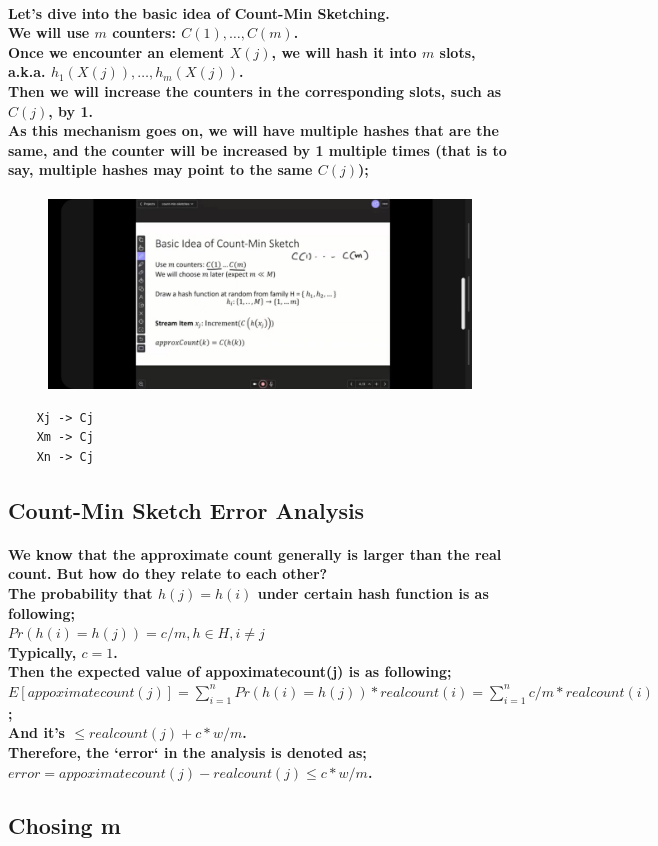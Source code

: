 \documentclass{article}
\begin{document}
\paragraph{
    Let's dive into the basic idea of Count-Min Sketching.\\
    We will use $m$ counters: $C(1), \ldots, C(m)$.\\
    Once we encounter an element $X(j)$, we will hash it into $m$ slots, a.k.a. $h_1(X(j)), \ldots, h_m(X(j))$.\\
    Then we will increase the counters in the corresponding slots, such as $C(j)$, by 1.\\
    As this mechanism goes on, we will have multiple hashes that are the same, and the counter will be increased by 1 multiple times
    (that is to say, multiple hashes may point to the same $C(j)$);\\
}

\begin{figure}[H]
    \includegraphics[width=\textwidth]{countminsketchbasicidea.jpg}
\end{figure}

\begin{verbatim}
    Xj -> Cj
    Xm -> Cj
    Xn -> Cj
\end{verbatim}

\subsection{Count-Min Sketch Error Analysis}

\paragraph{
    We know that the approximate count generally is larger than the real count. But how do they relate to each other?\\
    The probability that $h(j) = h(i)$ under certain hash function is as following;\\
    $Pr(h(i)=h(j)) = c/m, h \in H, i \neq j$\\
    Typically, $c=1$.\\
    Then the expected value of appoximatecount(j) is as following;\\
    $E[appoximatecount(j)] = \sum_{i=1}^n Pr(h(i)=h(j)) * realcount(i) = \sum_{i=1}^n c/m * realcount(i)$;\\
    And it's $\leq realcount(j) + c*w/m$.\\
    Therefore, the `error` in the analysis is denoted as;\\
    $error = appoximatecount(j) - realcount(j) \leq c*w/m$.\\
}

\subsection{Chosing m}
\end{document}
